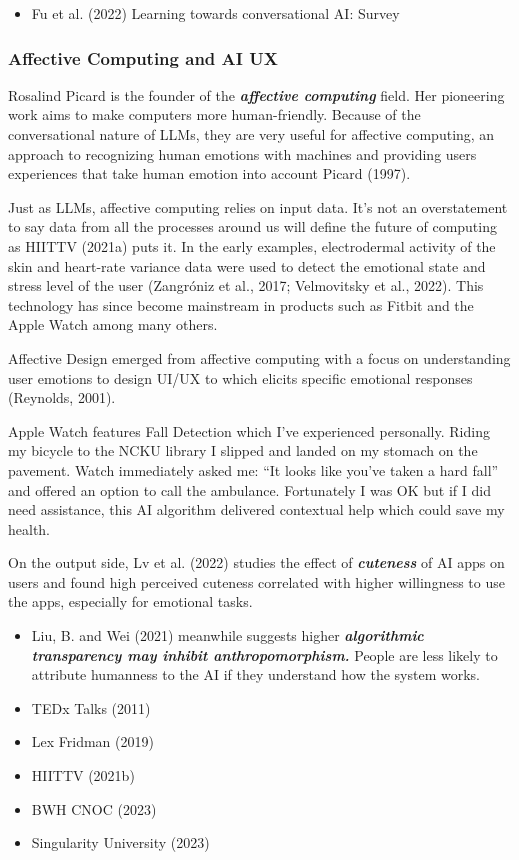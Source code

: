 \documentclass[
  letterpaper,
  DIV=11,
  numbers=noendperiod]{scrartcl}
\providecommand{\tightlist}{%
  \setlength{\itemsep}{0pt}\setlength{\parskip}{0pt}}\usepackage{longtable,booktabs,array}
\begin{document}
\begin{itemize}
\tightlist
\item
  Fu et al. (2022) Learning towards conversational AI: Survey
\end{itemize}

\subsubsection{Affective Computing and AI
UX}\label{affective-computing-and-ai-ux}

Rosalind Picard is the founder of the \textbf{\emph{affective
computing}} field. Her pioneering work aims to make computers more
human-friendly. Because of the conversational nature of LLMs, they are
very useful for affective computing, an approach to recognizing human
emotions with machines and providing users experiences that take human
emotion into account Picard (1997).

Just as LLMs, affective computing relies on input data. It's not an
overstatement to say data from all the processes around us will define
the future of computing as HIITTV (2021a) puts it. In the early
examples, electrodermal activity of the skin and heart-rate variance
data were used to detect the emotional state and stress level of the
user (Zangróniz et al., 2017; Velmovitsky et al., 2022). This technology
has since become mainstream in products such as Fitbit and the Apple
Watch among many others.

Affective Design emerged from affective computing with a focus on
understanding user emotions to design UI/UX to which elicits specific
emotional responses (Reynolds, 2001).

Apple Watch features Fall Detection which I've experienced personally.
Riding my bicycle to the NCKU library I slipped and landed on my stomach
on the pavement. Watch immediately asked me: ``It looks like you've
taken a hard fall'' and offered an option to call the ambulance.
Fortunately I was OK but if I did need assistance, this AI algorithm
delivered contextual help which could save my health.

On the output side, Lv et al. (2022) studies the effect of
\textbf{\emph{cuteness}} of AI apps on users and found high perceived
cuteness correlated with higher willingness to use the apps, especially
for emotional tasks.

\begin{itemize}
\tightlist
\item
  Liu, B. and Wei (2021) meanwhile suggests higher
  \textbf{\emph{algorithmic transparency may inhibit anthropomorphism.}}
  People are less likely to attribute humanness to the AI if they
  understand how the system works.
\item
  TEDx Talks (2011)
\item
  Lex Fridman (2019)
\item
  HIITTV (2021b)
\item
  BWH CNOC (2023)
\item
  Singularity University (2023)
\end{itemize}
\end{document}
